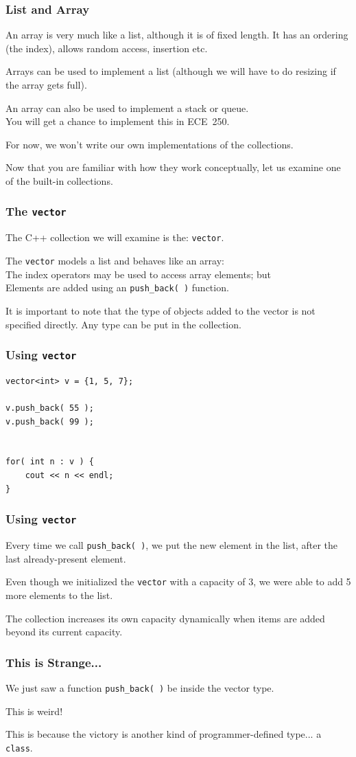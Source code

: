 \begin{frame}
\frametitle{List and Array}
An array is very much like a list, although it is of fixed length. It has an ordering (the index), allows random access, insertion etc.

Arrays can be used to implement a list (although we will have to do resizing if the array gets full).

An array can also be used to implement a stack or queue.\\
\quad You will get a chance to implement this in ECE~250.

For now, we won't write our own implementations of the collections.

Now that you are familiar with how they work conceptually, let us examine one of the built-in collections.

\end{frame}


\begin{frame}
\frametitle{The \texttt{vector}}

The C++ collection we will examine is the: \texttt{vector}.

The \texttt{vector}  models a list and behaves like an array:\\
\quad The index operators may be used to access array elements; but \\
\quad Elements are added using an \texttt{push\_back( )} function.

It is important to note that the type of objects added to the vector is not specified directly. Any type can be put in the collection.
\end{frame}

\begin{frame}[fragile]
\frametitle{Using \texttt{vector}}
\begin{verbatim}
vector<int> v = {1, 5, 7};
		
v.push_back( 55 );
v.push_back( 99 );


for( int n : v ) {
    cout << n << endl;
}
\end{verbatim}
\end{frame}


\begin{frame}
\frametitle{Using \texttt{vector}}

Every time we call \texttt{push\_back( )}, we put the new element in the list, after the last already-present element.

Even though we initialized the \texttt{vector} with a capacity of 3, we were able to add 5 more elements to the list.

The collection increases its own capacity dynamically when items are added beyond its current capacity.

\end{frame}



\begin{frame}
\frametitle{This is Strange...}

We just saw a function \texttt{push\_back( )} be inside the vector type.

This is weird!

This is because the victory is another kind of programmer-defined type... a \texttt{class}.


\end{frame}



